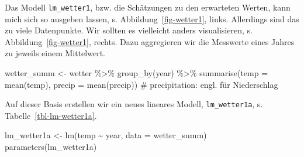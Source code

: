 \documentclass[
  letterpaper,
]{scrbook}
\newenvironment{Shaded}{\begin{snugshade}}{\end{snugshade}}
\newcommand{\AttributeTok}[1]{\textcolor[rgb]{0.40,0.45,0.13}{#1}}
\newcommand{\CommentTok}[1]{\textcolor[rgb]{0.37,0.37,0.37}{#1}}
\newcommand{\FunctionTok}[1]{\textcolor[rgb]{0.28,0.35,0.67}{#1}}
\newcommand{\NormalTok}[1]{\textcolor[rgb]{0.00,0.23,0.31}{#1}}
\newcommand{\OtherTok}[1]{\textcolor[rgb]{0.00,0.23,0.31}{#1}}
\newcommand{\SpecialCharTok}[1]{\textcolor[rgb]{0.37,0.37,0.37}{#1}}
\theoremstyle{definition}
\theoremstyle{definition}
\theoremstyle{definition}
\theoremstyle{remark}
\begin{document}
Das Modell \texttt{lm\_wetter1}, bzw. die Schätzungen zu den erwarteten
Werten, kann mich sich so ausgeben lassen, s.
Abbildung~\ref{fig-wetter1}, links. Allerdings sind das zu viele
Datenpunkte. Wir sollten es vielleicht anders visualisieren, s.
Abbildung~\ref{fig-wetter1}, rechts. Dazu aggregieren wir die Messwerte
eines Jahres zu jeweils einem Mittelwert.

\begin{Shaded}
\begin{Highlighting}[]
\NormalTok{wetter\_summ }\OtherTok{\textless{}{-}}
\NormalTok{  wetter }\SpecialCharTok{\%\textgreater{}\%} 
  \FunctionTok{group\_by}\NormalTok{(year) }\SpecialCharTok{\%\textgreater{}\%} 
  \FunctionTok{summarise}\NormalTok{(}\AttributeTok{temp =} \FunctionTok{mean}\NormalTok{(temp),}
            \AttributeTok{precip =} \FunctionTok{mean}\NormalTok{(precip))  }\CommentTok{\# precipitation: engl. für Niederschlag}
\end{Highlighting}
\end{Shaded}

Auf dieser Basis erstellen wir ein neues lineares Modell,
\texttt{lm\_wetter1a}, s. Tabelle~\ref{tbl-lm-wetter1a}.

\begin{Shaded}
\begin{Highlighting}[]
\NormalTok{lm\_wetter1a }\OtherTok{\textless{}{-}} \FunctionTok{lm}\NormalTok{(temp }\SpecialCharTok{\textasciitilde{}}\NormalTok{ year, }\AttributeTok{data =}\NormalTok{ wetter\_summ)}
\FunctionTok{parameters}\NormalTok{(lm\_wetter1a)}
\end{Highlighting}
\end{Shaded}
\end{document}
